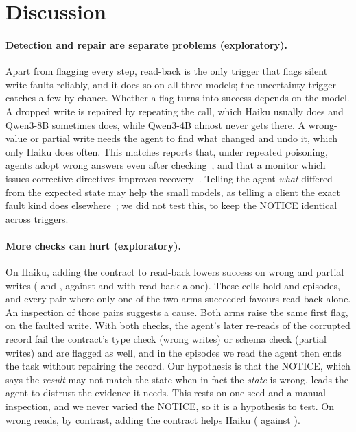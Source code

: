 \section{Discussion}\label{sec:discussion}
\paragraph{Detection and repair are separate problems (exploratory).} Apart from flagging every step, read-back is the
only trigger that flags silent write faults reliably, and it does so on all three models; the
uncertainty trigger catches a few by chance. Whether a flag turns
into success depends on the model. A dropped write is repaired by repeating the call, which Haiku
usually does and Qwen3-8B sometimes does, while Qwen3-4B almost never gets there. A wrong-value or
partial write needs the agent to find what changed and undo it, which only Haiku does often. This
matches reports that, under repeated poisoning, agents adopt wrong answers even after
checking~\cite{anon2026tools}, and that a monitor which issues corrective directives improves
recovery~\cite{kaynar2026tools}. Telling the agent \emph{what} differed from the expected state may
help the small models, as telling a client the exact fault kind does elsewhere~\cite{woo2026same}; we did not test this, to keep the NOTICE identical
across triggers.

\paragraph{More checks can hurt (exploratory).} On Haiku, adding the contract to read-back lowers
success on wrong and partial writes (\RHaikuWrongBothSuccess{} and \RHaikuPartialBothSuccess{}, against
\RHaikuWrongReadbackSuccess{} and \RHaikuPartialReadbackSuccess{} with read-back alone). These cells
hold \RHaikuWrongReadbackN{} and \RHaikuPartialReadbackN{} episodes, and every pair where only one of
the two arms succeeded favours read-back alone. An inspection of those pairs suggests a cause. Both arms
raise the same first flag, on the faulted write. With both checks, the agent's later re-reads of the
corrupted record fail the contract's type check (wrong writes) or schema check (partial writes) and
are flagged as well, and in the episodes we read the agent then ends the task without
repairing the record. Our hypothesis is that the NOTICE, which says the \emph{result} may not match the
state when in fact the \emph{state} is wrong, leads the agent to distrust the evidence it needs. This
rests on one seed and a manual inspection, and we never varied the NOTICE, so it is a hypothesis to
test. On wrong reads, by contrast, adding the contract helps Haiku (\RHaikuReadBothSuccess{} against
\RHaikuReadReadbackSuccess{}).

